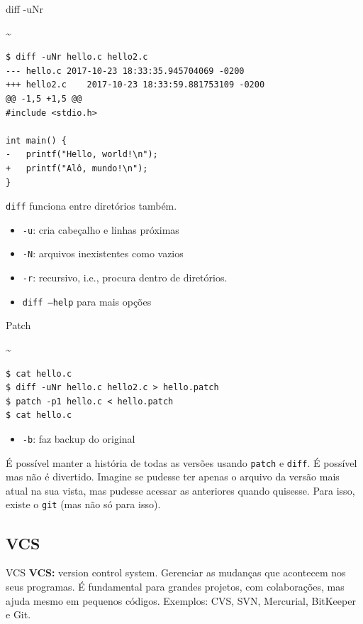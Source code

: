 \begin{frame}[fragile]{diff -uNr}
\begin{terminal}{\~}
\begin{Verbatim}
$ diff -uNr hello.c hello2.c 
--- hello.c	2017-10-23 18:33:35.945704069 -0200
+++ hello2.c	2017-10-23 18:33:59.881753109 -0200
@@ -1,5 +1,5 @@
#include <stdio.h>

int main() {
-   printf("Hello, world!\n");	
+   printf("Alô, mundo!\n");	
}
\end{Verbatim}
\end{terminal}
\texttt{diff} funciona entre diretórios também. 
\begin{itemize}
	\item \texttt{-u}: cria cabeçalho e linhas próximas
	\item \texttt{-N}: arquivos inexistentes como vazios
	\item \texttt{-r}: recursivo, i.e., procura dentro de diretórios. 
	\item \texttt{diff --help} para mais opções
\end{itemize}
\end{frame}

\begin{frame}[fragile]{Patch}
\begin{terminal}{\~}
\begin{Verbatim}	
$ cat hello.c
$ diff -uNr hello.c hello2.c > hello.patch
$ patch -p1 hello.c < hello.patch
$ cat hello.c 
\end{Verbatim}
\end{terminal}
\begin{itemize}
	\item \texttt{-b}: faz backup do original
\end{itemize}
É possível manter a história de todas as versões usando \texttt{patch} e \texttt{diff}. É possível mas não é divertido.
\vfill
Imagine se pudesse ter apenas o arquivo da versão mais atual na sua vista, mas pudesse acessar as anteriores quando quisesse. Para isso, existe o \texttt{git} (mas não só para isso).
\vfill
\end{frame}

\subsection{VCS}
\begin{frame}{VCS}
	\textbf{VCS:} version control system. Gerenciar as mudanças que acontecem nos seus programas. É fundamental para grandes projetos, com colaborações, mas ajuda mesmo em pequenos códigos. Exemplos: CVS, SVN, Mercurial, BitKeeper e Git. 
\end{frame}

